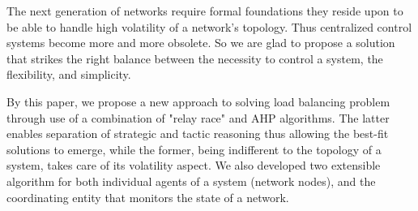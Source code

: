 The next generation of networks require formal foundations they reside upon to be able to handle high volatility of a network's topology.
Thus centralized control systems become more and more obsolete.
So we are glad to propose a solution that strikes the right balance between the necessity to control a system, the flexibility, and simplicity.

By this paper, we propose a new approach to solving load balancing problem through use of a combination of "relay race" and AHP algorithms.
The latter enables separation of strategic and tactic reasoning thus allowing the best-fit solutions to emerge, while the former, being indifferent to the topology of a system, takes care of its volatility aspect.
We also developed two extensible algorithm for both individual agents of a system (network nodes), and the coordinating entity that monitors the state of a network.
